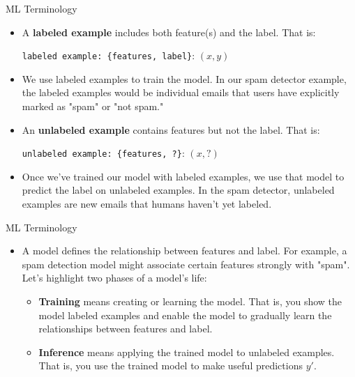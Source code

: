\documentclass{beamer}
\begin{document}
\begin{frame}{ML Terminology}

\begin{itemize}
\item A {\bf labeled example} includes both feature(s) and the label. That is:

\medskip
\texttt{labeled example: \{features, label\}}: $(x, y)$

\item We use labeled examples to train the model. In our spam detector example, the labeled examples would be individual emails that users have explicitly marked as "spam" or "not spam."

\item 
An {\bf unlabeled example} contains features but not the label. That is:

\medskip
\texttt{unlabeled example: \{features, ?\}}: $(x, ?)$

\item Once we've trained our model with labeled examples, we use that model to predict the label on unlabeled examples. In the spam detector, unlabeled examples are new emails that humans haven't yet labeled.
\end{itemize}

\end{frame}

\begin{frame}{ML Terminology}
\begin{itemize}
    \item A model defines the relationship between features and label. For example, a spam detection model might associate certain features strongly with "spam". Let's highlight two phases of a model's life:
    \begin{itemize}
        \item {\bf Training} means creating or learning the model. That is, you show the model labeled examples and enable the model to gradually learn the relationships between features and label.
        
        \item {\bf Inference} means applying the trained model to unlabeled examples. That is, you use the trained model to make useful predictions $y'$.
    \end{itemize}
\end{itemize}
\end{frame}
\end{document}
